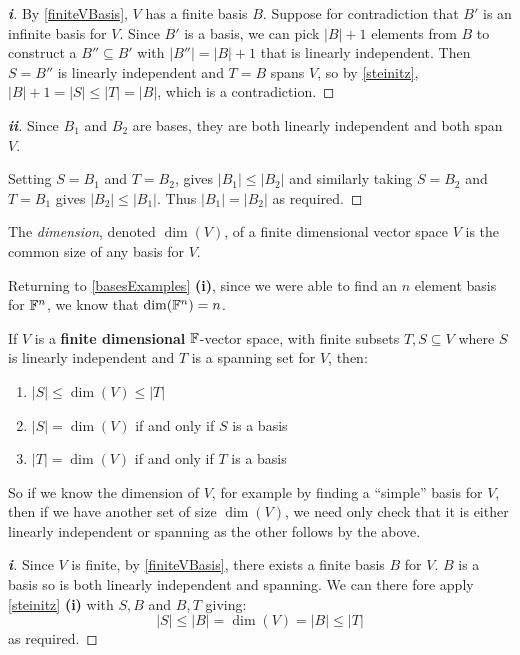 \documentclass[../main.tex]{subfiles}
\begin{document}
\begin{proof}[\textbf{i}]
  By \cref{finiteVBasis}, $V$ has a finite basis $B$.
  Suppose for contradiction that $B'$ is an infinite basis for $V$.
  Since $B'$ is a basis, we can pick $|B| + 1$ elements from $B$ to construct a $B'' \subseteq B'$ with $|B''| = |B| + 1$ that is linearly independent.
  Then $S = B''$ is linearly independent and $T = B$ spans $V$, so by \cref{steinitz}, $|B| + 1 = |S| \leq |T| = |B|$, which is a contradiction.
\end{proof}
\begin{proof}[\textbf{ii}]
  Since $B_1$ and $B_2$ are bases, they are both linearly independent and both span $V$.

  Setting $S = B_1$ and $T = B_2$, gives $|B_1| \leq |B_2|$ and similarly taking $S = B_2$ and $T = B_1$ gives $|B_2| \leq |B_1|$.
  Thus $|B_1| = |B_2|$ as required.
\end{proof}
\begin{definition}[Dimension]
  The \textit{dimension}, denoted $\dim(V)$, of a finite dimensional vector space $V$ is the common size of any basis for $V$.
\end{definition}
\begin{example}
  Returning to \cref{basesExamples} \textbf{(i)}, since we were able to find an $n$ element basis for $\mathbb{F}^n$, we know that $\dim(\mathbb{F}^n) = n$.
\end{example}
\begin{corollary}
  If $V$ is a \textbf{finite dimensional} $\mathbb{F}$-vector space, with finite subsets $T, S \subseteq V$ where $S$ is linearly independent and $T$ is a spanning set for $V$, then: \label{dimIneq}
  \begin{enumerate}
    \item $|S| \leq \dim(V) \leq |T|$
    \item $|S| = \dim(V)$ if and only if $S$ is a basis
    \item $|T| = \dim(V)$ if and only if $T$ is a basis
  \end{enumerate}
\end{corollary}
\begin{remark}
  So if we know the dimension of $V$, for example by finding a ``simple'' basis for $V$, then if we have another set of size $\dim(V)$, we need only check that it is either linearly independent or spanning as the other follows by the above.
\end{remark}
\begin{proof}[\textbf{i}]
  Since $V$ is finite, by \cref{finiteVBasis}, there exists a finite basis $B$ for $V$.
  $B$ is a basis so is both linearly independent and spanning.
  We can there fore apply \cref{steinitz} \textbf{(i)} with $S, B$ and $B, T$ giving:
  \[
    |S| \leq |B| = \dim(V) = |B| \leq |T|
  \]
  as required.
\end{proof}
\end{document}

